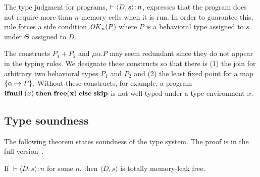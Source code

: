 The type judgment for programs, \(\vdash \langle D, s \rangle \!:\! n\),
expresses that the program does not require more than \(n\) memory
cells when it is run.  In order to guarantee this, rule 
forces a side condition \(\mathit{OK}_n(P)\) where \(P\) is a behavioral type
assigned to \(s\) under \(\Theta\) assigned to \(D\).

 
\begin{remark}
The constructs \(P_1 + P_2\) and \(\mu\alpha. P\) may seem redundant
since they do not appear in the typing rules.  We designate these
constructs so that there is (1) the join for arbitrary two behavioral
types \(P_1\) and \(P_2\) and (2) the least fixed point for a map
\(\{\alpha \mapsto P\}\).  Without these constructs, for example, a
program \(\mathbf{ifnull}\;(x) \; \mathbf{then}\; \mathbf{free(x)}\; \mathbf{else}\; \mathbf{skip}\) is not well-typed
under a type environment \(x\).
\end{remark}


\subsection{Type soundness}


The following theorem states soundness of the type system.  The proof
is in the full version~\cite{fullversion}.

\begin{theorem}\label{thm1}
If $\vdash \langle D, s \rangle : n$ for some \(n\), then \(\langle D,
s \rangle\) is totally memory-leak free.
\end{theorem}

